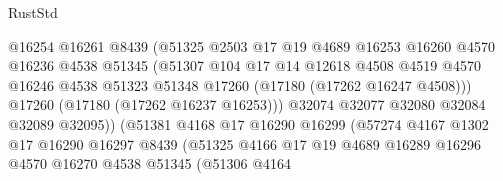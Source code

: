 \begin{lexlean}{RustStd}
\begin{coremodule}
                                  @16254
                                  @16261
                                  @8439
                                  (@51325
                                    @2503
                                    @17
                                    @19
                                    @4689
                                    @16253
                                    @16260
                                    @4570
                                    @16236
                                    @4538
                                    @51345
                                    (@51307
                                      @104
                                      @17
                                      @14
                                      @12618
                                      @4508
                                      @4519
                                      @4570
                                      @16246
                                      @4538
                                      @51323
                                      @51348
                                      @17260
                                      (@17180 (@17262 @16247 @4508)))
                                    @17260
                                    (@17180 (@17262 @16237 @16253)))
                                  @32074
                                  @32077
                                  @32080
                                  @32084
                                  @32089
                                  @32095))
                              (@51381
                                @4168
                                @17
                                @16290
                                @16299
                                (@57274
                                  @4167
                                  @1302
                                  @17
                                  @16290
                                  @16297
                                  @8439
                                  (@51325
                                    @4166
                                    @17
                                    @19
                                    @4689
                                    @16289
                                    @16296
                                    @4570
                                    @16270
                                    @4538
                                    @51345
                                    (@51306
                                      @4164

\end{coremodule}
\end{lexlean}
